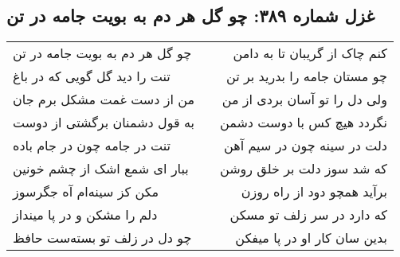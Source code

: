 \begin{center}
\section*{غزل شماره ۳۸۹: چو گل هر دم به بویت جامه در تن}
\label{sec:sh389}
\begin{longtable}{l p{0.5cm} r}
چو گل هر دم به بویت جامه در تن
&&
کنم چاک از گریبان تا به دامن
\\
تنت را دید گل گویی که در باغ
&&
چو مستان جامه را بدرید بر تن
\\
من از دست غمت مشکل برم جان
&&
ولی دل را تو آسان بردی از من
\\
به قول دشمنان برگشتی از دوست
&&
نگردد هیچ کس با دوست دشمن
\\
تنت در جامه چون در جام باده
&&
دلت در سینه چون در سیم آهن
\\
ببار ای شمع اشک از چشم خونین
&&
که شد سوز دلت بر خلق روشن
\\
مکن کز سینه‌ام آه جگرسوز
&&
برآید همچو دود از راه روزن
\\
دلم را مشکن و در پا مینداز
&&
که دارد در سر زلف تو مسکن
\\
چو دل در زلف تو بسته‌ست حافظ
&&
بدین سان کار او در پا میفکن
\\
\end{longtable}
\end{center}
